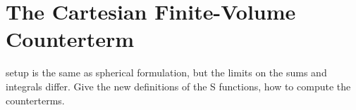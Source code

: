 \section{The Cartesian \Luscher Finite-Volume Counterterm}\label{sec:counterterm/cartesian}

setup is the same as spherical formulation, but the limits on the sums and integrals differ.  Give the new definitions of the S functions, how to compute the counterterms.
